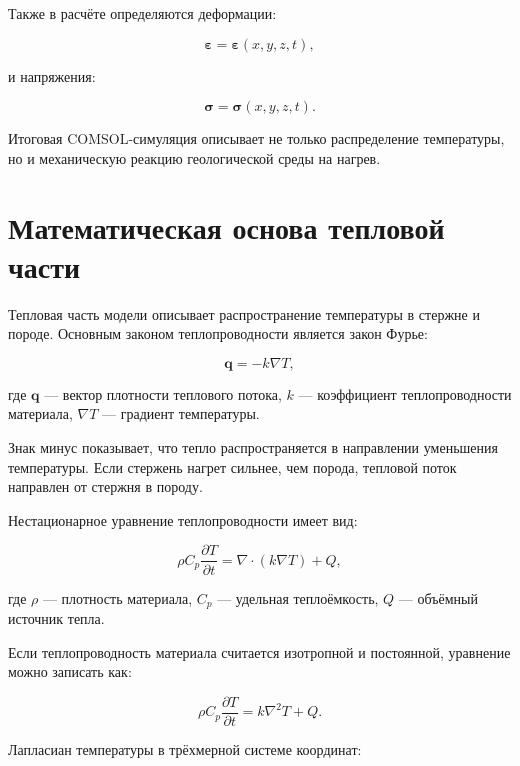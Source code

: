 Также в расчёте определяются деформации:

\begin{equation}
\boldsymbol{\varepsilon}=\boldsymbol{\varepsilon}(x,y,z,t),
\end{equation}

и напряжения:

\begin{equation}
\boldsymbol{\sigma}=\boldsymbol{\sigma}(x,y,z,t).
\end{equation}

Итоговая COMSOL-симуляция описывает не только распределение температуры, но и механическую реакцию геологической среды на нагрев.

\section{Математическая основа тепловой части}

Тепловая часть модели описывает распространение температуры в стержне и породе. Основным законом теплопроводности является закон Фурье:

\begin{equation}
\mathbf{q}=-k\nabla T,
\end{equation}

где $\mathbf{q}$ --- вектор плотности теплового потока, $k$ --- коэффициент теплопроводности материала, $\nabla T$ --- градиент температуры.

Знак минус показывает, что тепло распространяется в направлении уменьшения температуры. Если стержень нагрет сильнее, чем порода, тепловой поток направлен от стержня в породу.

Нестационарное уравнение теплопроводности имеет вид:

\begin{equation}
\rho C_p\frac{\partial T}{\partial t}=\nabla\cdot(k\nabla T)+Q,
\end{equation}

где $\rho$ --- плотность материала, $C_p$ --- удельная теплоёмкость, $Q$ --- объёмный источник тепла.

Если теплопроводность материала считается изотропной и постоянной, уравнение можно записать как:

\begin{equation}
\rho C_p\frac{\partial T}{\partial t}=k\nabla^2T+Q.
\end{equation}

Лапласиан температуры в трёхмерной системе координат:

